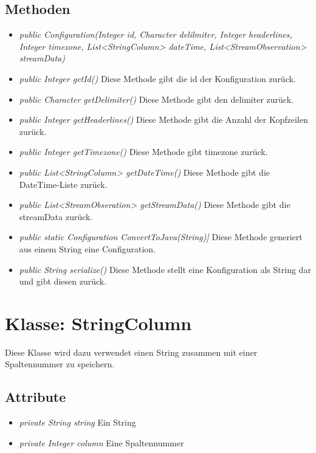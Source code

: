 \subsection{Methoden}
\begin{itemize}
	\item \textit{public Configuration(Integer id, Character delilmiter, Integer headerlines, Integer timezone, List<StringColumn> dateTime, List<StreamObservation> streamData)}
	
	\item \textit{public Integer getId()} Diese Methode gibt die id der Konfiguration zurück.
	
	\item \textit{public Character getDelimiter()} Diese Methode gibt den delimiter zurück.
	
	\item \textit{public Integer getHeaderlines()} Diese Methode gibt die Anzahl der Kopfzeilen zurück.
	
	\item \textit{public Integer getTimezone()} Diese Methode gibt timezone zurück.	
	
	\item \textit{public List<StringColumn> getDateTime()} Diese Methode gibt die DateTime-Liste zurück.
	
	\item \textit{public List<StreamObseration> getStreamData()} Diese Methode gibt die streamData zurück.

	\item \textit{public static Configuration ConvertToJava(String)]} Diese Methode generiert aus einem String eine Configuration.
	
	\item \textit{public String serialize()} Diese Methode stellt eine Konfiguration als String dar und gibt diesen zurück.
\end{itemize}


\section{Klasse: StringColumn}
Diese Klasse wird dazu verwendet einen String zusammen mit einer Spaltennummer zu speichern.
\subsection{Attribute}
\begin{itemize}
	\item \textit{private String string} Ein String
	\item \textit{private Integer column} Eine Spaltennummer
\end{itemize} 

